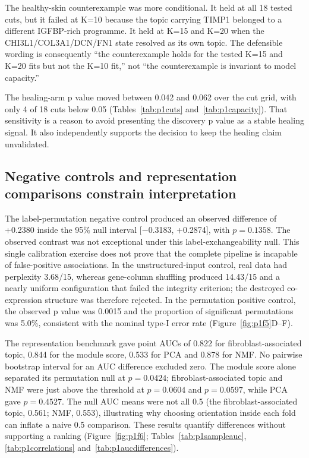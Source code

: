 

The healthy-skin counterexample was more conditional. It held at all 18 tested cuts, but it failed at K=10 because the topic carrying TIMP1 belonged to a different IGFBP-rich programme. It held at K=15 and K=20 when the CHI3L1/COL3A1/DCN/FN1 state resolved as its own topic. The defensible wording is consequently ``the counterexample holds for the tested K=15 and K=20 fits but not the K=10 fit,'' not ``the counterexample is invariant to model capacity.''

The healing-arm p value moved between 0.042 and 0.062 over the cut grid, with only 4 of 18 cuts below 0.05 (Tables~\ref{tab:p1cuts} and~\ref{tab:p1capacity}). That sensitivity is a reason to avoid presenting the discovery p value as a stable healing signal. It also independently supports the decision to keep the healing claim unvalidated.

\subsection{Negative controls and representation comparisons constrain interpretation}

The label-permutation negative control produced an observed difference of +0.2380 inside the 95\% null interval {[}−0.3183, +0.2874{]}, with $p=0.1358$. The observed contrast was not exceptional under this label-exchangeability null. This single calibration exercise does not prove that the complete pipeline is incapable of false-positive associations. In the unstructured-input control, real data had perplexity 3.68/15, whereas gene-column shuffling produced 14.43/15 and a nearly uniform configuration that failed the integrity criterion; the destroyed co-expression structure was therefore rejected. In the permutation positive control, the observed p value was 0.0015 and the proportion of significant permutations was 5.0\%, consistent with the nominal type-I error rate (Figure~\ref{fig:p1f5}D--F).

The representation benchmark gave point AUCs of 0.822 for fibroblast-associated topic, 0.844 for the module score, 0.533 for PCA and 0.878 for NMF. No pairwise bootstrap interval for an AUC difference excluded zero. The module score alone separated its permutation null at $p=0.0424$; fibroblast-associated topic and NMF were just above the threshold at $p=0.0604$ and $p=0.0597$, while PCA gave $p=0.4527$. The null AUC means were not all 0.5 (the fibroblast-associated topic, 0.561; NMF, 0.553), illustrating why choosing orientation inside each fold can inflate a naive 0.5 comparison. These results quantify differences without supporting a ranking (Figure~\ref{fig:p1f6}\label{call:p1f6}; Tables~\ref{tab:p1sampleauc}, \ref{tab:p1correlations} and~\ref{tab:p1aucdifferences}).


